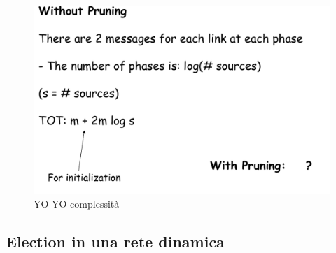 \documentclass[12pt]{article}
\begin{document}
			\begin{figure}[h!]
				\centering
				\includegraphics[scale=0.30]{img/yoco.png}
				\caption{YO-YO complessità}
			\end{figure}
	\subsection{Election in una rete dinamica}
		
\end{document}
